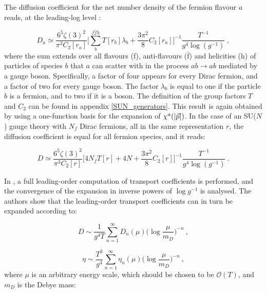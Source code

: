 The diffusion coefficient for the net number density of the fermion flavour $a$ reads, at the leading-log level \cite{Arnold:2000dr}:

\begin{equation}
D_a \simeq \frac{6^5 \zeta(3)^2}{\pi^3 C_2[r_a]} \biggl[ \sum_b^{f \bar{f} h} T[r_b] \lambda_b + \frac{3 \pi^2}{8} 
C_2[r_a] \biggr]^{-1}  \frac{T^{-1}}{g^4 \log(g^{-1})}\;, 
\label{diff_coeff}
\end{equation}
%
where the sum extends over all flavours (f), anti-flavours ($\bar{\mathrm f}$) and helicities (h) of particles of species $b$ that $a$ can scatter with in the process $ab \to ab$ mediated by a gauge boson. Specifically, a factor of four appears for every Dirac fermion, and a factor of two for every gauge boson. The factor $\lambda_b$  is  equal to one if the particle $b$ is a fermion, and to two if it is a boson. The definition of the group factors $T$ and $C_2$ can be found in appendix \ref{SUN_generators}. This result is again obtained by using a one-function basis for the expansion of $\chi^a(\abs{\vec p})$. In the case of an SU($N$) gauge theory with $N_f$ Dirac fermions, all in the same representation $r$, the diffusion coefficient is equal for all fermion species, and it reads:

\begin{equation}
D \simeq \frac{6^5 \zeta(3)^2}{\pi^3 C_2[r]} \biggl[ 4 N_f T[r] + 4 N + \frac{3 \pi^2}{8} C_2[r] \biggr]^{-1} 
 \frac{T^{-1}}{g^4\log(g^{-1})} \;.
\end{equation}

In \cite{Arnold:2003zc}, a full leading-order computation of transport coefficients is performed, and the convergence of the expansion in inverse powers of $\log g^{-1}$ is analysed. The authors show that the leading-order transport coefficients can in turn be expanded according to:

\begin{equation}
D \sim \frac{1}{g^4 T} \sum_{n=1}^{\infty} D_n(\mu) \biggl( \log\frac{\mu}{m_D}\biggr)^{-n} \: ,
\label{D_series}
\end{equation}

\begin{equation}
\eta \sim \frac{T^3}{g^4} \sum_{n=1}^{\infty} \eta_n(\mu) \biggl( \log\frac{\mu}{m_D}\biggr)^{-n} \: ,
\label{eta_series}
\end{equation}
%
where $\mu$ is an arbitrary energy scale, which should be chosen to be $\mathcal O(T)$, and $m_D$ is the Debye mass:

